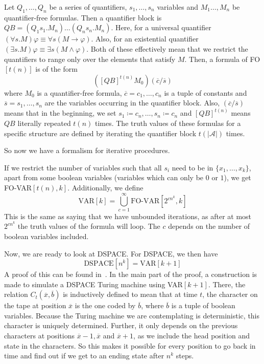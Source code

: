\begin{define}[{FO$[t(n)]$}]
    Let $Q_1, \dots, Q_n$ be a series of quantifiers, $s_1, \dots, s_n$ variables and $M_1 \dots, M_n$ be quantifier-free formulas.
    Then a quantifier block is $QB = (Q_{1}s_{1}.M_{n})\dots(Q_{n}s_{n}.M_{n})$.
    Here, for a universal quantifier $(\forall s.M)\varphi \equiv \forall s (M \to \varphi)$.
    Also, for an existential quantifier $(\exists s.M)\varphi \equiv \exists s(M \land \varphi)$.
    Both of these effectively mean that we restrict the quantifiers to range only over the elements that satisfy $M$.
    Then, a formula of FO$[t(n)]$ is of the form
    \[
        \left([QB]^{t(n)}M_{0}\right)(\overline{c} / \overline{s})
    \]
    where $M_0$ is a quantifier-free formula, $\overline{c} = c_1, \dots, c_n$ is a tuple of constants and $\overline{s} = s_1, \dots, s_n$ are the variables occurring in the quantifier block.
    Also, $(\overline{c} / \overline{s})$ means that in the beginning, we set $s_1 \coloneqq c_n, \dots, s_n \coloneqq c_n$ and $[QB]^{t(n)}$ means $QB$ literally repeated $t(n)$ times.
    The truth values of these formulas for a specific structure are defined by iterating the quantifier block $t(|\mathcal{A}|)$ times.
\end{define}
So now we have a formalism for iterative procedures.

If we restrict the number of variables such that all $s_i$ need to be in $\{x_1, \dots, x_k \}$, apart from some boolean variables (variables which can only be $0$ or $1$), we get FO-VAR$[t(n), k]$.
Additionally, we define
\[
    \text{VAR}[k] = \bigcup_{c = 1}^{\infty}\text{FO-VAR}[2^{cn^k}, k]
\]
This is the same as saying that we have unbounded iterations, as after at most $2^{cn^k}$ the truth values of the formula will loop.
The $c$ depends on the number of boolean variables included.

Now, we are ready to look at DSPACE\@.
For DSPACE, we then have
\[
    \text{DSPACE}[n^k] = \text{VAR}[k + 1]
\]
A proof of this can be found in~\cite{descriptive-complexity}.
In the main part of the proof, a construction is made to simulate a DSPACE Turing machine using VAR$[k + 1]$.
There, the relation $C_{t}(\overline{x}, \overline{b})$ is inductively defined to mean that at time $t$, the character on the tape at position $\overline{x}$ is the one coded by $\overline{b}$, where $\overline{b}$ is a tuple of boolean variables.
Because the Turing machine we are contemplating is deterministic, this character is uniquely determined.
Further, it only depends on the previous characters at positions $\overline{x} - 1, \overline{x}$ and $\overline{x} + 1$, as we include the head position and state in the characters.
So this makes it possible for every position to go back in time and find out if we get to an ending state after $n^k$ steps.

